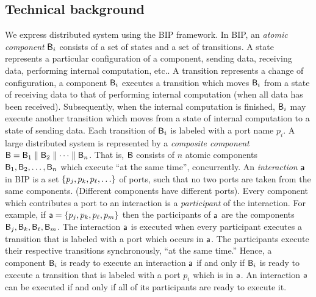 

\subsection{Technical background}

We express distributed system using the BIP \cite{bip06,BliudzeS08} framework. In BIP, an \emph{atomic component} $\mathsf{B}_i$ consists of a set of states and a set of
transitions. A state represents a particular configuration of a component, \eg sending data, receiving data, performing internal computation, etc..
A transition represents a change of configuration, \eg a component $\mathsf{B}_i$ executes a transition which moves $\mathsf{B}_i$ from a 
state of receiving data to that of performing internal computation (\eg when all data has been received). Subsequently, when the internal computation
is finished, $\mathsf{B}_i$ may execute another transition which moves from a state of internal computation to a state of sending data.
Each transition of $\mathsf{B}_i$ is labeled with a port name $p_i$. 
A large distributed system is represented by a \emph{composite component} $\mathsf{B} = \mathsf{B}_1 \parallel \mathsf{B}_2 \parallel \cdots \parallel \mathsf{B}_n$. That is, $\mathsf{B}$ consists of $n$
atomic components $\mathsf{B}_1, \mathsf{B}_2,  \ldots,  \mathsf{B}_n$ which execute ``at the same time'', \ie concurrently. 
An \emph{interaction} $\mathsf{a}$ in BIP is a set $\{ p_j, p_k, p_{\ell}, \ldots \}$ of ports, such that no two ports are taken from the same components.
(Different components have different ports). Every component which contributes a port to an interaction is a \emph{participant} of the interaction.
For example, if  $\mathsf{a} = \{ p_j, p_k, p_{\ell}, p_m \}$ then the participants of $\mathsf{a}$ are the components $\mathsf{B}_j, \mathsf{B}_k, \mathsf{B}_{\ell}, \mathsf{B}_m$.
The interaction $\mathsf{a}$ is executed when every participant executes a transition that is labeled with a port which occurs in $\mathsf{a}$. 
The participants execute their respective transitions synchronously,
\ie ``at the same time.'' 
%
Hence, a component $\mathsf{B}_i$ is ready to execute an interaction $\mathsf{a}$
if and only if $\mathsf{B}_i$ is ready to execute a transition that is labeled
with a port $p_i$ which is in $\mathsf{a}$.
An interaction $\mathsf{a}$ can be executed if and only if all of its
participants are ready to execute it.